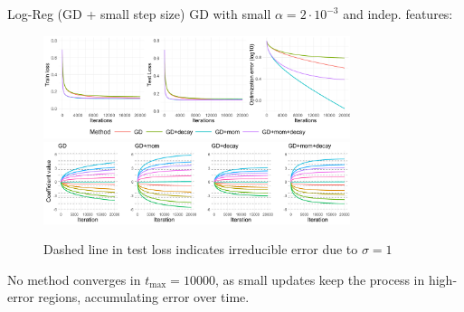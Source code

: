 \documentclass[11pt,compress,t,notes=noshow, xcolor=table]{beamer}
\begin{document}
\begin{vbframe}{Log-Reg (GD + small step size)}
\vspace{-0.4cm}
GD with small $\alpha=2\cdot10^{-3}$ and indep. features:
\begin{figure}
            \includegraphics[width=0.8\textwidth]{slides/04-multivariate-first-order/figure_man/simu_linmod/GD_log_small_lr_iters.pdf} \\
             \includegraphics[width=0.8\textwidth]{slides/04-multivariate-first-order/figure_man/simu_linmod/GD_log_coef_small.pdf}\\
            \begin{footnotesize}
                Dashed line in test loss indicates irreducible error due to $\sigma=1$
            \end{footnotesize}
\end{figure}
No method converges in $t_{\text{max}}=10000$, as small updates keep the process in high-error regions, accumulating error over time.
\end{vbframe}
\end{document}
